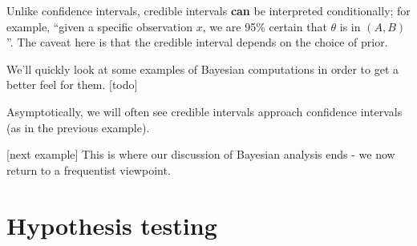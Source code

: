 \documentclass[egregdoesnotlikesansseriftitles,a4paper]{scrartcl}
\begin{document}
\begin{remark}
      Unlike confidence intervals, credible intervals \textbf{can} be interpreted conditionally; for example, ``given a specific observation $x$, we are 95\% certain that $\theta $ is in $(A,B)$''. The caveat here is that the credible interval depends on the choice of prior.
\end{remark}
We'll quickly look at some examples of Bayesian computations in order to get a better feel for them.
[todo]
\begin{remark}
      Asymptotically, we will often see credible intervals approach confidence intervals (as in the previous example).
\end{remark}
[next example]
This is where our discussion of Bayesian analysis ends - we now return to a frequentist viewpoint.
\newpage
\section{Hypothesis testing}
\end{document}

